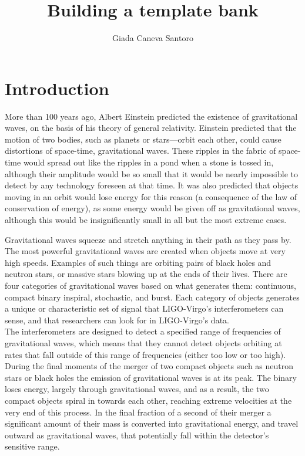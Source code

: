 \documentclass[binding=0.6cm, LaM]{sapthesis}
\title{Building a template bank}
\author{Giada Caneva Santoro}
\begin{document}
\frontmatter
\maketitle
\dedication{Fortsett å gå.}


\tableofcontents

\mainmatter 

\chapter{Introduction}

	More than 100 years ago, Albert Einstein predicted the existence of gravitational waves,
	on the basis of his theory of general relativity.  
	Einstein predicted that the motion of two bodies, such as planets or stars—orbit each other,
	could cause distortions of space-time, gravitational waves.
	These ripples in the fabric of space-time would spread out like the ripples in a pond when a stone is tossed in,
	although their amplitude would be so small that it would be nearly impossible to detect by any technology foreseen at that time.
	It was also predicted that objects moving in an orbit would lose energy for this reason 
	(a consequence of the law of conservation of energy), as some energy would be given off as gravitational waves, 
	although this would be insignificantly small in all but the most extreme cases. 

	Gravitational waves squeeze and stretch anything in their path as they pass by.
	The most powerful gravitational waves are created when objects move at very high speeds. 
	Examples of such things are orbiting pairs of black holes and neutron stars, 
	or massive stars blowing up at the ends of their lives.
	There are four categories of gravitational waves based on what generates them: 
	continuous, compact binary inspiral, stochastic, and burst. 	
	Each category of objects generates a unique or characteristic set of signal 
	that LIGO-Virgo's interferometers can sense, and that researchers can look for in LIGO-Virgo’s data. \\
        The interferometers are designed to detect a specified range of frequencies of gravitational waves,
        which means that they cannot detect objects orbiting at rates that fall outside of this range of frequencies 
        (either too low or too high). \\ 
	During the final moments of the merger of two compact objects such as neutron stars 
	or black holes the emission of gravitational waves is at its peak. The binary loses energy, 
	largely through gravitational waves, and as a result, the two compact objects spiral in towards each other, 
	reaching extreme velocities at the very end of this process. 
	In the final fraction of a second of their merger a significant amount of their mass is converted into gravitational energy, 
	and travel outward as gravitational waves, that potentially fall within the detector’s sensitive range. 
 
\end{document}
